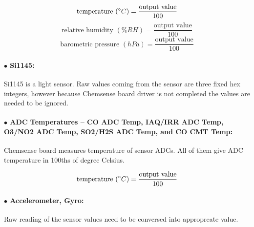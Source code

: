 \bigbreak
{\centering
 \[ \text{temperature }(\degree C) = \frac{\text{output value}}{100} \]
 \[ \text{relative humidity }(\% RH) = \frac{\text{output value}}{100} \]
 \[ \text{barometric pressure }(hPa) = \frac{\text{output value}}{100} \]
 }

\paragraph{$\bullet$ Si1145:}

Si1145 is a light sensor. Raw values coming from the sensor are three fixed hex integers, however because Chemsense board driver is not completed the values are needed to be ignored.


\paragraph{$\bullet$ ADC Temperatures -- CO ADC Temp, IAQ/IRR ADC Temp, O3/NO2 ADC Temp, SO2/H2S ADC Temp, and CO CMT Temp:}
Chemsense board measures temperature of sensor ADCs. All of them give ADC temperature in 100ths of degree Celsius.


{\centering 
 \[ \text{temperature }(\degree C) = \frac{\text{output value}}{100} \]
 \par
}


\paragraph{$\bullet$ Accelerometer, Gyro:}
Raw reading of the sensor values need to be conversed into appropreate value.
